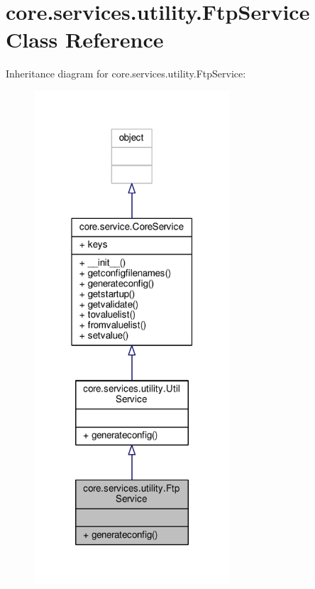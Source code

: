 \hypertarget{classcore_1_1services_1_1utility_1_1_ftp_service}{\section{core.\+services.\+utility.\+Ftp\+Service Class Reference}
\label{classcore_1_1services_1_1utility_1_1_ftp_service}
}


Inheritance diagram for core.\+services.\+utility.\+Ftp\+Service\+:
\nopagebreak
\begin{figure}[H]
\begin{center}
\leavevmode
\includegraphics[width=207pt]{classcore_1_1services_1_1utility_1_1_ftp_service__inherit__graph}
\end{center}
\end{figure}


